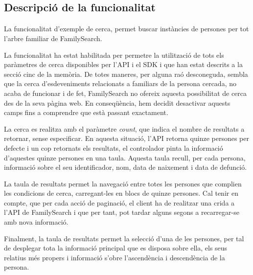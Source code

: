 \subsection{Descripció de la funcionalitat}

    \paragraph{}
    La funcionalitat d'exemple de cerca, permet buscar instàncies de persones per tot l'arbre familiar de FamilySearch.

    La funcionalitat ha estat habilitada per permetre la utilització de tots els paràmetres de cerca disponibles per l'API i el SDK i que han estat descrits a la secció cinc de la memòria. De totes maneres, per alguna raó desconeguda, sembla que la cerca d'esdeveniments relacionats a familiars de la persona cercada, no acaba de funcionar i de fet, FamilySearch no ofereix aquesta possibilitat de cerca des de la seva pàgina web. En conseqüència, hem decidit desactivar aquests camps fins a comprendre que està passant exactament.

    La cerca es realitza amb el paràmetre \emph{count}, que indica el nombre de resultats a retornar, sense especificar. En aquesta situació, l'API retorna quinze persones per defecte i un cop retornats els resultats, el controlador pinta la informació d'aquestes quinze persones en una taula. Aquesta taula recull, per cada persona, informació sobre el seu identificador, nom, data de naixement i data de defunció.

    La taula de resultats permet la navegació entre totes les persones que complien les condicions de cerca, carregant-les en blocs de quinze persones. Cal tenir en compte, que per cada acció de paginació, el client ha de realitzar una crida a l'API de FamilySearch i que per tant, pot tardar alguns segons a recarregar-se amb nova informació.

    Finalment, la taula de resultats permet la selecció d'una de les persones, per tal de desplegar tota la informació principal que es disposa sobre ella, els seus relatius més propers i informació s'obre l'ascendència i descendència de la persona.
